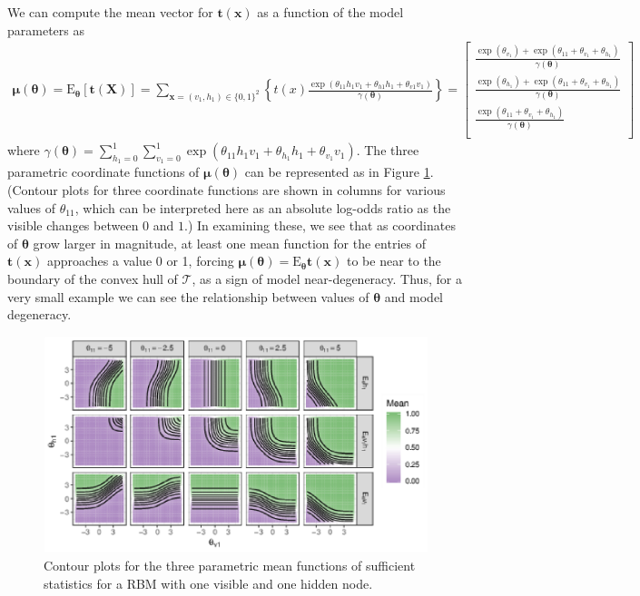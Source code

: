 \documentclass[12pt]{article}
\theoremstyle{definition}
\begin{document}
We can compute the mean vector for \(\boldsymbol t(\boldsymbol x)\) as a
function of the model parameters as
\begin{align*}
\boldsymbol \mu(\boldsymbol \theta) = \text{E}_{\boldsymbol \theta}\left[ \boldsymbol t(\boldsymbol X) \right] =  \sum\limits_{\boldsymbol x = (v_1, h_1) \in \{0,1\}^2} \left\{ t(x) \frac{\exp\left( \theta_{11} h_1 v_1 + \theta_{h1} h_1 + \theta_{v1} v_1\right)}{\gamma(\boldsymbol \theta)} \right\} = \left[
\begin{matrix}
\frac{\exp\left(\theta_{v_1}\right) + \exp\left(\theta_{11} + \theta_{v_1} + \theta_{h_1}\right)}{\gamma(\boldsymbol \theta)} \\
\frac{\exp\left(\theta_{h_1}\right) + \exp\left(\theta_{11} + \theta_{v_1} + \theta_{h_1}\right)}{\gamma(\boldsymbol \theta)} \\
\frac{\exp\left(\theta_{11} + \theta_{v_1} + \theta_{h_1}\right)}{\gamma(\boldsymbol \theta)} \\
\end{matrix} \right]
\end{align*}
where
\(\gamma(\boldsymbol \theta) = \sum\limits_{h_1 = 0}^1\sum\limits_{v_1 = 0}^1 \exp(\theta_{11} h_1 v_1 + \theta_{h_1}h_1 + \theta_{v_1}v_1)\).
The three parametric coordinate functions of
\(\boldsymbol \mu(\boldsymbol \theta)\) can be represented as in Figure
\ref{fig:degen-toy}. (Contour plots for three coordinate functions are
shown in columns for various values of \(\theta_{11}\), which can be
interpreted here as an absolute log-odds ratio as the visible changes
between \(0\) and \(1\).) In examining these, we see that as coordinates
of \(\boldsymbol \theta\) grow larger in magnitude, at least one mean
function for the entries of \(\boldsymbol t(\boldsymbol x)\) approaches
a value 0 or 1, forcing
\(\boldsymbol \mu(\boldsymbol \theta) = \text{E}_{\boldsymbol \theta} \boldsymbol t(\boldsymbol x)\)
to be near to the boundary of the convex hull of \(\mathcal{T}\), as a
sign of model near-degeneracy. Thus, for a very small example we can see
the relationship between values of \(\boldsymbol \theta\) and model
degeneracy. \par
\begin{figure}

{\centering \includegraphics{paper_files/figure-latex/degen-toy-1} 

}

\caption{Contour plots for the three parametric mean functions of sufficient statistics for a RBM with one visible and one hidden node.}\label{fig:degen-toy}
\end{figure}
\end{document}
